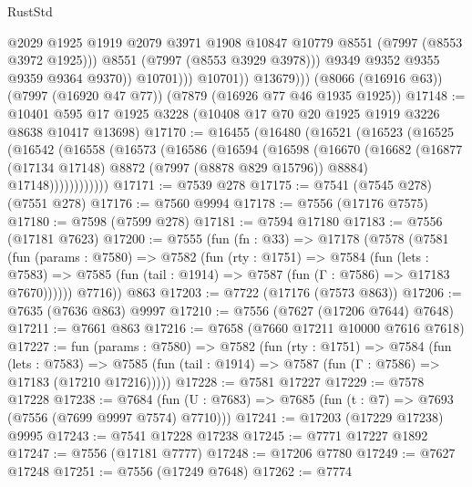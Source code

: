 \begin{lexlean}{RustStd}
\begin{coremodule}
                            @2029
                            @1925
                            @1919
                            @2079
                            @3971
                            @1908
                            @10847
                            @10779
                            @8551
                            (@7997 (@8553 @3972 @1925)))
                          @8551
                          (@7997 (@8553 @3929 @3978)))
                        @9349
                        @9352
                        @9355
                        @9359
                        @9364
                        @9370))
                    @10701)))
              @10701))
          @13679)))
    (@8066 (@16916 @63))
    (@7997 (@16920 @47 @77))
    (@7879 (@16926 @77 @46 @1935 @1925))
@17148 := @10401 @595 @17 @1925 @3228 (@10408 @17 @70 @20 @1925 @1919 @3226 @8638 @10417 @13698)
@17170 := @16455
    (@16480
      (@16521
        (@16523
          (@16525
            (@16542
              (@16558
                (@16573
                  (@16586
                    (@16594
                      (@16598
                        (@16670
                          (@16682
                            (@16877 (@17134 @17148) @8872 (@7997 (@8878 @829 @15796)) @8884)
                            @17148))))))))))))
@17171 := @7539 @278
@17175 := @7541 (@7545 @278) (@7551 @278)
@17176 := @7560 @9994
@17178 := @7556 (@17176 @7575)
@17180 := @7598 (@7599 @278)
@17181 := @7594 @17180
@17183 := @7556 (@17181 @7623)
@17200 := @7555
    (fun (fn : @33) =>
    @17178
      (@7578
        (@7581
          (fun (params : @7580) =>
          @7582
            (fun (rty : @1751) =>
            @7584
              (fun (lets : @7583) =>
              @7585 (fun (tail : @1914) => @7587 (fun (Γ : @7586) => @17183 @7670))))))
        @7716))
    @863
@17203 := @7722 (@17176 (@7573 @863))
@17206 := @7635 (@7636 @863) @9997
@17210 := @7556 (@7627 (@17206 @7644) @7648)
@17211 := @7661 @863
@17216 := @7658 (@7660 @17211 @10000 @7616 @7618)
@17227 := fun (params : @7580) =>
  @7582
    (fun (rty : @1751) =>
    @7584
      (fun (lets : @7583) =>
      @7585 (fun (tail : @1914) => @7587 (fun (Γ : @7586) => @17183 (@17210 @17216)))))
@17228 := @7581 @17227
@17229 := @7578 @17228
@17238 := @7684 (fun (U : @7683) => @7685 (fun (t : @7) => @7693 (@7556 (@7699 @9997 @7574) @7710)))
@17241 := @17203 (@17229 @17238) @9995
@17243 := @7541 @17228 @17238
@17245 := @7771 @17227 @1892
@17247 := @7556 (@17181 @7777)
@17248 := @17206 @7780
@17249 := @7627 @17248
@17251 := @7556 (@17249 @7648)
@17262 := @7774

\end{coremodule}
\end{lexlean}
